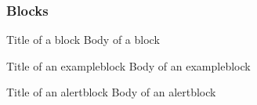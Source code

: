 \begin{frame}
  \frametitle{Blocks}

  \begin{block}{Title of a block}		%
    Body of a block
  \end{block}

  \begin{exampleblock}{Title of an exampleblock}
    Body of an exampleblock
  \end{exampleblock}

  \begin{alertblock}{Title of an alertblock}
    Body of an alertblock
  \end{alertblock}
  
\end{frame}

